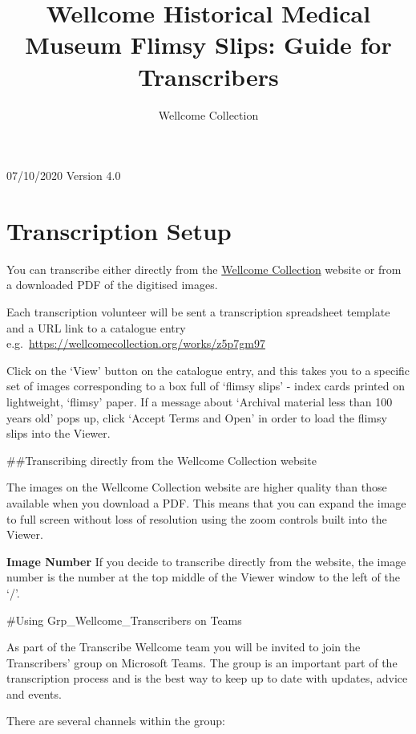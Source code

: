 \documentclass[
  openany]{book}
\title{Wellcome Historical Medical Museum Flimsy Slips: Guide for Transcribers}
\author{Wellcome Collection}
\date{}
\begin{document}
\maketitle

{
\setcounter{tocdepth}{1}
\tableofcontents
}
07/10/2020
Version 4.0

\hypertarget{transcription-setup}{%
\chapter{Transcription Setup}\label{transcription-setup}}

You can transcribe either directly from the \href{wellcomecollection.org}{Wellcome Collection} website or from a downloaded PDF of the digitised images.

Each transcription volunteer will be sent a transcription spreadsheet template and a URL link to a catalogue entry
e.g.~\url{https://wellcomecollection.org/works/z5p7gm97}

Click on the `View' button on the catalogue entry, and this takes you to a specific set of images corresponding to a box full of `flimsy slips' - index cards printed on lightweight, `flimsy' paper. If a message about `Archival material less than 100 years old' pops up, click `Accept Terms and Open' in order to load the flimsy slips into the Viewer.

\#\#Transcribing directly from the Wellcome Collection website

The images on the Wellcome Collection website are higher quality than those available when you download a PDF. This means that you can expand the image to full screen without loss of resolution using the zoom controls built into the Viewer.

\textbf{Image Number} If you decide to transcribe directly from the website, the image number is the number at the top middle of the Viewer window to the left of the `/'.

\#Using Grp\_Wellcome\_Transcribers on Teams

As part of the Transcribe Wellcome team you will be invited to join the Transcribers' group on Microsoft Teams. The group is an important part of the transcription process and is the best way to keep up to date with updates, advice and events.

There are several channels within the group:
\end{document}
